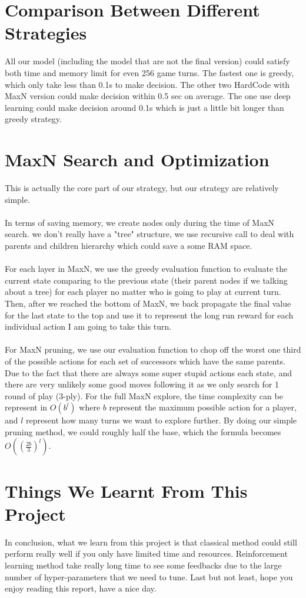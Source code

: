 \documentclass[11pt]{article}
\begin{document}
\section{Comparison Between Different Strategies}

All our model (including the model that are not the final version) could satisfy both
time and memory limit for even 256 game turns. The fastest one is greedy, 
which only take less than 0.1s to make decision. 
The other two HardCode with MaxN version could make decision within 0.5 sec on average.
The one use deep learning could make decision around 0.1s which is just a little bit longer than greedy strategy.

\section{MaxN Search and Optimization}
This is actually the core part of our strategy, but our strategy are relatively simple. 
\\
\\
In terms of saving memory, we create nodes only during the time of MaxN search.
we don't really have a "tree" structure, we use recursive call to deal with parents and children 
hierarchy which could save a some RAM space.
\\
\\
For each layer in MaxN, we use the greedy evaluation function to evaluate the current state comparing to the previous state 
(their parent nodes if we talking about a tree)
for each player no matter who is going to play at current turn. Then, after we reached the bottom of MaxN, we back propagate the 
final value for the last state to the top and use it to represent the long run reward for each individual action I am going to take 
this turn.
\\
\\
For MaxN pruning, we use our evaluation function to chop off the worst 
one third of the possible actions for each set of successors which have the same parents. Due to the fact that there are always
some super stupid actions each state, and there are very unlikely some good moves following it as we only search for 1 round of
play (3-ply). 
For the full MaxN explore, the time complexity can be represent in $O(b^l)$ 
where $b$ represent the maximum possible action for a player, and $l$ represent how many turns we want to explore further.
By doing our simple pruning method, we could roughly half the base, which the formula becomes $O((\frac{2b}{3})^l)$.

\section{Things We Learnt From This Project}
In conclusion, what we learn from this project is that classical method could still perform really well 
if you only have limited time and resources. Reinforcement learning method take really long time to see some 
feedbacks due to the large number of hyper-parameters that we need to tune. 
Last but not least, hope you enjoy reading this report, have a nice day.
\end{document}

